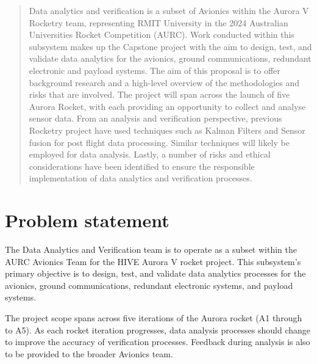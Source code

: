 \begin{abstract}
Data analytics and verification is a subset of Avionics within the Aurora V Rocketry team, representing RMIT University in the 2024 Australian Universities Rocket Competition (AURC). Work conducted within this subsystem makes up the Capstone project with the aim to design, test, and validate data analytics for the avionics, ground communications, redundant electronic and payload systems. The aim of this proposal is to offer background research and a high-level overview of the methodologies and risks that are involved. The project will span across the launch of five Aurora Rocket, with each providing an opportunity to collect and analyse sensor data. From an analysis and verification perspective, previous Rocketry project have used techniques such as Kalman Filters and Sensor fusion for post flight data processing. Similar techniques will likely be employed for data analysis. Lastly, a number of risks and ethical considerations have been identified to ensure the responsible implementation of data analytics and verification processes.  
\end{abstract}

\section{Problem statement}
The Data Analytics and Verification team is to operate as a subset within the AURC Avionics Team for the HIVE Aurora V rocket project. This subsystem's primary objective is to design, test, and validate data analytics processes for the avionics, ground communications, redundant electronic systems, and payload systems.  

The project scope spans across five iterations of the Aurora rocket (A1 through to A5). As each rocket iteration progresses, data analysis processes should change to improve the accuracy of verification processes. Feedback during analysis is also to be provided to the broader Avionics team.     

